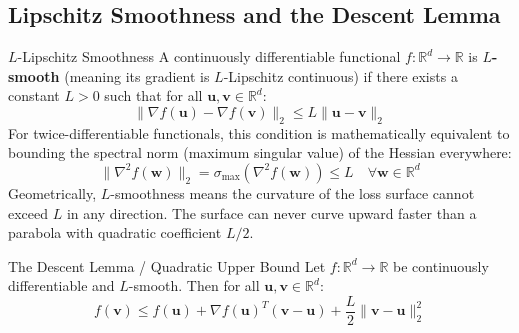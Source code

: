 \subsection{Lipschitz Smoothness and the Descent Lemma}

\begin{definitionbox}{$L$-Lipschitz Smoothness}
A continuously differentiable functional $f: \mathbb{R}^d \to \mathbb{R}$ is \textbf{$L$-smooth} (meaning its gradient is $L$-Lipschitz continuous) if there exists a constant $L > 0$ such that for all $\mathbf{u}, \mathbf{v} \in \mathbb{R}^d$:
\begin{equation}
\|\nabla f(\mathbf{u}) - \nabla f(\mathbf{v})\|_2 \le L \|\mathbf{u} - \mathbf{v}\|_2
\label{eq:lipschitz_grad}
\end{equation}
For twice-differentiable functionals, this condition is mathematically equivalent to bounding the spectral norm (maximum singular value) of the Hessian everywhere:
\begin{equation}
\|\nabla^2 f(\mathbf{w})\|_2 = \sigma_{\max}(\nabla^2 f(\mathbf{w})) \le L \quad \forall \mathbf{w} \in \mathbb{R}^d
\end{equation}
Geometrically, $L$-smoothness means the curvature of the loss surface cannot exceed $L$ in any direction. The surface can never curve upward faster than a parabola with quadratic coefficient $L/2$.
\end{definitionbox}

\begin{theorembox}{The Descent Lemma / Quadratic Upper Bound}
Let $f: \mathbb{R}^d \to \mathbb{R}$ be continuously differentiable and $L$-smooth. Then for all $\mathbf{u}, \mathbf{v} \in \mathbb{R}^d$:
\begin{equation}
f(\mathbf{v}) \le f(\mathbf{u}) + \nabla f(\mathbf{u})^T (\mathbf{v} - \mathbf{u}) + \frac{L}{2} \|\mathbf{v} - \mathbf{u}\|_2^2
\label{eq:descent_lemma}
\end{equation}
\end{theorembox}

